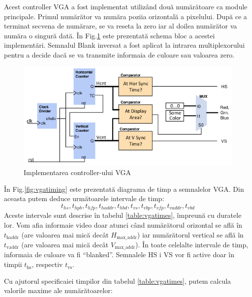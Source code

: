\documentclass[a4paper,11pt,romanian]{article}
\begin{document}
{Acest controller VGA a fost implementat utiliz\^{a}nd dou\u{a} num\u{a}r\u{a}toare ca module principale. Primul num\u{a}r\u{a}tor va num\u{a}ra poziia orizontal\u{a} a pixelului. Dup\u{a} ce a terminat secvena de num\u{a}rare, se va reseta la zero iar al doilea num\u{a}r\u{a}tor va num\u{a}ra o singur\u{a} dat\u{a}. \^{I}n Fig.\ref{fig:vgactl} este prezentat\u{a} schema bloc a acestei implement\u{a}ri. Semnalul Blank inversat a fost aplicat la intrarea multiplexorului pentru a decide dac\u{a} se va transmite informaia de culoare sau valoarea zero.

\begin{figure}
  \begin{center}
   \includegraphics[scale=0.5]{VGA_BlockDiagram.png}
   \caption{Implementarea controller-ului VGA}
   \label{fig:vgactl}
  \end{center}
 \end{figure}
 
 \^{I}n Fig.\ref{fig:vgatiming} este prezentat\u{a} diagrama de timp a semnalelor VGA. Din aceasta putem deduce urm\u{a}toarele intervale de timp:
 \[t_{hs}, t_{hpb}, t_{hfp}, t_{haddr}, t_{hbd}, t_{vs}, t_{vbp}, t_{vfp}, t_{vaddr}, t_{vbd}\]
 Aceste intervale sunt descrise \^{i}n tabelul \ref{table:vgatimes}, \^{i}mpreun\u{a} cu duratele lor.
    Vom afia informaie video doar atunci c\^{a}nd num\u{a}r\u{a}torul orizontal se afl\u{a} \^{i}n $t_{\text{haddr}}$ (are valoarea mai mic\u{a} dec\^{a}t $H_{\text{max_{addr}}}$) iar num\u{a}r\u{a}torul vertical se afl\u{a} \^{i}n $t_{\text{vaddr}}$ (are valoarea mai mic\u{a} dec\^{a}t $V_{\text{max_{addr}}}$).
 \^{I}n toate celelalte intervale de timp, informaia de culoare va fi ``blanked''. Semnalele HS i VS vor fi active doar \^{i}n timpii $t_{\text{hs}}$, respectiv $t_{\text{vs}}$.
 
 Cu ajutorul specificaiei timpilor din tabelul \ref{table:vgatimes}, putem calcula valorile maxime ale num\u{a}r\u{a}toarelor:
 
}
\end{document}
